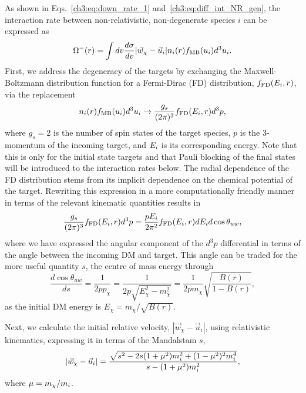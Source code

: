 As shown in Eqs.~\ref{ch3:eq:down_rate_1} and~\ref{ch3:eq:diff_int_NR_gen}, the interaction rate between non-relativistic, non-degenerate species $i$ can be expressed as
\begin{equation}
    \Omega^{-}(r) = \int dv \frac{d\sigma}{dv} |\vec{w}_\chi -\vec{u}_i| n_i(r) f_{\rm MB}(u_i)d^3u_i.
    \label{ch3:eq:NR_int_rate_simple}
\end{equation}
First, we address the degeneracy of the targets by exchanging the Maxwell-Boltzmann distribution function for a Fermi-Dirac (FD) distribution, $f_{\rm FD}(E_i,r)$, via the replacement
\begin{equation}
    n_i(r) f_{\rm MB}(u_i)d^3 u_i \rightarrow \frac{g_s}{(2\pi)^3}f_{\rm FD}(E_i, r)d^3p,
    \label{ch3:eq:number_density_replacement}
\end{equation}
where $g_s = 2$ is the number of spin states of the target species, $p$ is the 3-momentum of the incoming target, and $E_i$ is its corresponding energy. Note that this is only for the initial state targets and that Pauli blocking of the final states will be introduced to the interaction rates below. The radial dependence of the FD distribution stems from its implicit dependence on the chemical potential of the target. Rewriting this expression in a more computationally friendly manner in terms of the relevant kinematic quantities results in 
\begin{equation}
    \frac{g_s}{(2\pi)^3}f_{\rm FD}(E_i, r)d^3p = \frac{p E_i}{2\pi^2}f_{\rm FD}(E_i, r) dE_i d\cos\theta_{uw},
    \label{ch3:eq:free_Fermi_number}
\end{equation}
where we have expressed the angular component of the $d^3 p$ differential in terms of the angle between the incoming DM and target. This angle can be traded for the more useful quantity $s$, the centre of mass energy through
\begin{equation}
    \frac{d\cos\theta_{uw}}{ds} = \frac{1}{2 p p_\chi} = \frac{1}{2 p \sqrt{E_\chi^2 - m_\chi^2}} = \frac{1}{2 p m_\chi}\sqrt{\frac{B(r)}{1 - B(r)}},
\end{equation}
as the initial DM energy is $E_\chi = m_\chi/\sqrt{B(r)}$.

Next, we calculate the initial relative velocity, $|\vec{w}_\chi -\vec{u}_i|$, using relativistic kinematics, expressing it in terms of the Mandalstam $s$, 
\begin{equation}
    |\vec{w}_\chi -\vec{u}_i| = \frac{\sqrt{s^2 - 2 s (1 + \mu^2)m_i^2 + (1 - \mu^2)^2 m_i^4}}{s - (1 + \mu^2) m_i^2},
\end{equation}
where $\mu = m_\chi/m_i$.

